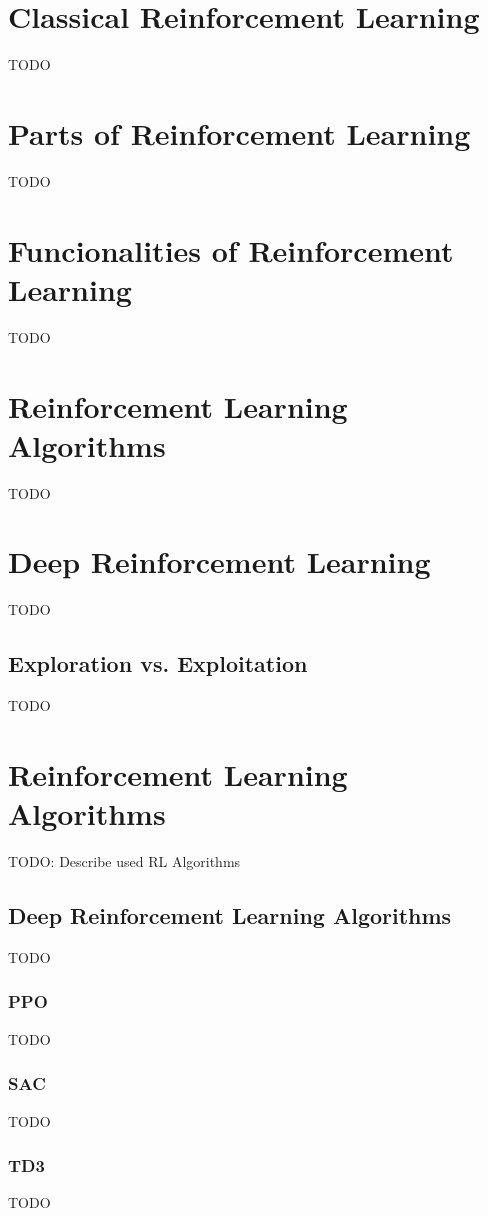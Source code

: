 \section{Classical Reinforcement Learning}
TODO


\section{Parts of Reinforcement Learning}
TODO


\section{Funcionalities of Reinforcement Learning}
TODO


\section{Reinforcement Learning Algorithms}
TODO


\section{Deep Reinforcement Learning}
TODO

\subsection{Exploration vs. Exploitation}
TODO


\section{Reinforcement Learning Algorithms}
TODO: Describe used RL Algorithms

\subsection{Deep Reinforcement Learning Algorithms}
TODO

\subsubsection{PPO}
TODO

\subsubsection{SAC}
TODO

\subsubsection{TD3}
TODO

